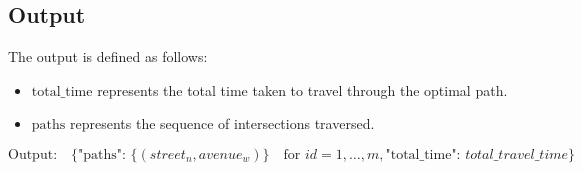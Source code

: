\documentclass{article}
\begin{document}
\subsection*{Output}
The output is defined as follows:

\begin{itemize}
    \item \( \text{total\_time} \) represents the total time taken to travel through the optimal path.
    \item \( \text{paths} \) represents the sequence of intersections traversed.
\end{itemize}

\[
\text{Output:} \quad \{
    \text{"paths": } \{ (street_{n}, avenue_{w}) \} \quad \text{for } id = 1, \ldots, m,
    \text{"total\_time": } total\_travel\_time
\}
\]
\end{document}
